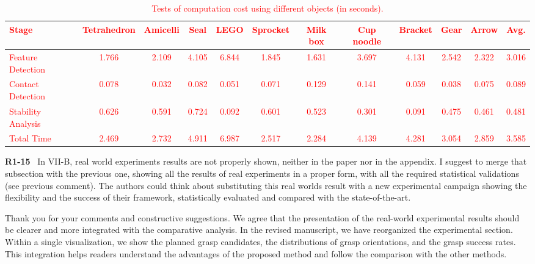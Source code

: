 \documentclass[journal]{IEEEtran}
\newcommand{\rev}[1]{\textcolor{red}{#1}}
\begin{document}
\begin{table}[ht]
    \centering
    \small
    \rev{
    \begin{threeparttable}
    \setlength{\tabcolsep}{5pt}
    \caption{\rev{Tests of computation cost using different objects (in seconds).}}
    \label{tab:computation_time_r2}
    \begin{tabular}{l|cccccccccc|c}
        \toprule
        \textbf{Stage} & Tetrahedron & Amicelli & Seal & LEGO & Sprocket & Milk box & Cup noodle & Bracket & Gear & Arrow & \textbf{Avg.} \\
        \midrule
        Feature Detection & 1.766 & 2.109 & 4.105 & 6.844 & 1.845 & 1.631 & 3.697 & 4.131 & 2.542 & 2.322 & 3.016 \\
        Contact Detection & 0.078 & 0.032 & 0.082 & 0.051 & 0.071 & 0.129 & 0.141 & 0.059 & 0.038 & 0.075 & 0.089 \\
        Stability Analysis & 0.626 & 0.591 & 0.724 & 0.092 & 0.601 & 0.523 & 0.301 & 0.091 & 0.475 & 0.461 & 0.481\\
        Total Time & 2.469 & 2.732 & 4.911 & 6.987 & 2.517 & 2.284 & 4.139 & 4.281 & 3.054 & 2.859 & 3.585\\
        \bottomrule
    \end{tabular}
    \end{threeparttable}}
    
\end{table}


\noindent
{\textbf{\color{black}R1-15}\color{gray}~
In VII-B, real world experiments results are not properly shown, neither in the paper nor in the appendix. I suggest to merge that subsection with the previous one, showing all the results of real experiments in a proper form, with all the required statistical validations (see previous comment). The authors could think about substituting this real worlds result with a new experimental campaign showing the flexibility and the success of their framework, statistically evaluated and compared with the state-of-the-art.
}

Thank you for your comments and constructive suggestions. We agree that the presentation of the real-world experimental results should be clearer and more integrated with the comparative analysis. In the revised manuscript, we have reorganized the experimental section. Within a single visualization, we show the planned grasp candidates, the distributions of grasp orientations, and the grasp success rates. This integration helps readers understand the advantages of the proposed method and follow the comparison with the other methods.
\end{document}
